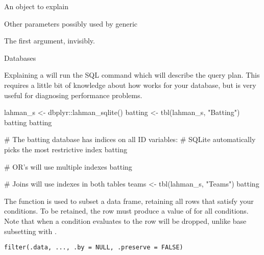 \documentclass[a4paper]{book}
\begin{document}
%
\begin{Arguments}
\begin{ldescription}
\item[\code{x}] An object to explain

\item[\code{...}] Other parameters possibly used by generic
\end{ldescription}
\end{Arguments}
%
\begin{Value}
The first argument, invisibly.
\end{Value}
%
\begin{Section}{Databases}

Explaining a  will run the SQL  command which
will describe the query plan. This requires a little bit of knowledge about
how  works for your database, but is very useful for
diagnosing performance problems.
\end{Section}
%
\begin{Examples}
\begin{ExampleCode}


lahman_s <- dbplyr::lahman_sqlite()
batting <- tbl(lahman_s, "Batting")
batting %
batting %

# The batting database has indices on all ID variables:
# SQLite automatically picks the most restrictive index
batting %

# OR's will use multiple indexes
batting %

# Joins will use indexes in both tables
teams <- tbl(lahman_s, "Teams")
batting %


\end{ExampleCode}
\end{Examples}
%
\begin{Description}
The  function is used to subset a data frame,
retaining all rows that satisfy your conditions.
To be retained, the row must produce a value of  for all conditions.
Note that when a condition evaluates to 
the row will be dropped, unlike base subsetting with \code{[}.
\end{Description}
%
\begin{Usage}
\begin{verbatim}
filter(.data, ..., .by = NULL, .preserve = FALSE)
\end{verbatim}
\end{Usage}
\end{document}
